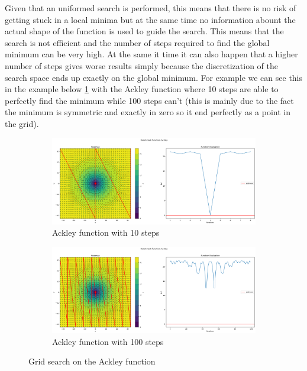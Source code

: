 Given that an uniformed search is performed, this means that there is no risk of getting stuck in a local minima but at the same time no information abount the actual shape of the function is used to guide the search. This means that the search is not efficient and the number of steps required to find the global minimum can be very high. At the same it time it can also happen that a higher number of steps gives worse results simply because the discretization of the search space ends up exactly on the global minimum. For example we can see this in the example below \ref{fig:gs-ackley} with the Ackley function where 10 steps are able to perfectly find the minimum while 100 steps can't (this is mainly due to the fact the minimum is symmetric and exactly in zero so it end perfectly as a point in the grid).

\begin{figure}[H]
    \begin{subfigure}{0.5\textwidth}
        \includegraphics[width=\textwidth]{lab1/imgs/gs_ackley_10.png}
        \caption{Ackley function with 10 steps}
    \end{subfigure}
    \begin{subfigure}{0.5\textwidth}
        \includegraphics[width=\textwidth]{lab1/imgs/gs_ackley_100.png}
        \caption{Ackley function with 100 steps}
    \end{subfigure}
    \caption{Grid search on the Ackley function}
    \label{fig:gs-ackley}
\end{figure}


